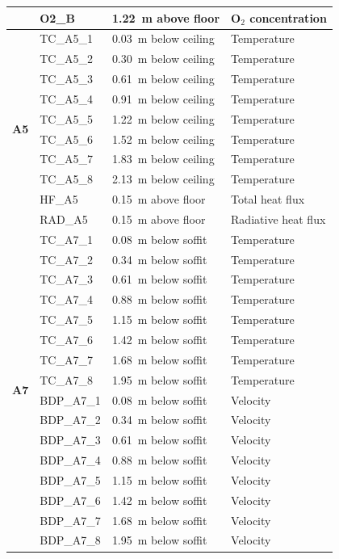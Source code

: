 \documentclass[12pt,oneside]{book}
\begin{document}
\begin{longtable}[c]{c|lll}
 & O2\_B      & 1.22~m above floor   & O$_2$ concentration \\
\midrule
\multirow{10}{*}{\large{\textbf{A5}}}
 & TC\_A5\_1  & 0.03~m below ceiling & Temperature \\
 & TC\_A5\_2  & 0.30~m below ceiling & Temperature \\
 & TC\_A5\_3  & 0.61~m below ceiling & Temperature \\
 & TC\_A5\_4  & 0.91~m below ceiling & Temperature \\
 & TC\_A5\_5  & 1.22~m below ceiling & Temperature \\
 & TC\_A5\_6  & 1.52~m below ceiling & Temperature \\
 & TC\_A5\_7  & 1.83~m below ceiling & Temperature \\
 & TC\_A5\_8  & 2.13~m below ceiling & Temperature \\
\cline{2-4}
 & HF\_A5	  & 0.15~m above floor   & Total heat flux \\
 & RAD\_A5    & 0.15~m above floor   & Radiative heat flux \\
\midrule
\multirow{16}{*}{\large{\textbf{A7}}}
 & TC\_A7\_1  & 0.08~m below soffit  & Temperature \\
 & TC\_A7\_2  & 0.34~m below soffit  & Temperature \\
 & TC\_A7\_3  & 0.61~m below soffit  & Temperature \\
 & TC\_A7\_4  & 0.88~m below soffit  & Temperature \\
 & TC\_A7\_5  & 1.15~m below soffit  & Temperature \\
 & TC\_A7\_6  & 1.42~m below soffit  & Temperature \\
 & TC\_A7\_7  & 1.68~m below soffit  & Temperature \\
 & TC\_A7\_8  & 1.95~m below soffit  & Temperature \\
\cline{2-4}
 & BDP\_A7\_1 & 0.08~m below soffit  & Velocity \\
 & BDP\_A7\_2 & 0.34~m below soffit  & Velocity \\
 & BDP\_A7\_3 & 0.61~m below soffit  & Velocity \\
 & BDP\_A7\_4 & 0.88~m below soffit  & Velocity \\
 & BDP\_A7\_5 & 1.15~m below soffit  & Velocity \\
 & BDP\_A7\_6 & 1.42~m below soffit  & Velocity \\
 & BDP\_A7\_7 & 1.68~m below soffit  & Velocity \\
 & BDP\_A7\_8 & 1.95~m below soffit  & Velocity \\

\end{longtable}
\end{document}

